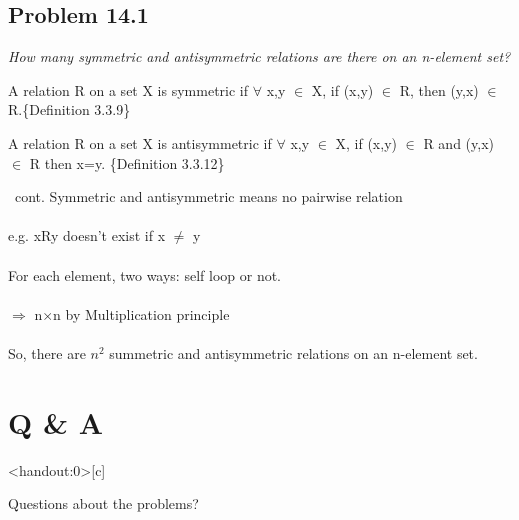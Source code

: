 \documentclass{beamer}
\begin{document}
        
        
    \subsection{Problem 14.1}
    
        \begin{frame}[c,shrink]{\subsecname}
            \textit{How many symmetric and antisymmetric relations are there on an n-element
set?}\\\pause
                \begin{definition}
			    A relation R on a set X is \alert{symmetric} if $\forall$ x,y $\in$ X, if (x,y) $\in$ R, then (y,x) $\in$ R.\{Definition 3.3.9\}
                \end{definition}\pause
                \begin{definition}
			    A relation R on a set X is \alert{antisymmetric} if $\forall$ x,y $\in$ X, if (x,y) $\in$ R and (y,x) $\in$ R then x=y. \{Definition 3.3.12\}
                \end{definition}
        \end{frame}
    
        \begin{frame}[c]{\subsecname\ cont.}
            Symmetric and antisymmetric means \alert{no pairwise relation}\\$\;$\\\pause
            e.g. xRy doesn't exist if x $\neq$ y\\$\;$\\\pause
            For each element, two ways: self loop or not.\\$\;$\\\pause
            $\Rightarrow$ n$\times$n by Multiplication principle\\$\;$\\\pause
            So, there are $n^2$ summetric and antisymmetric relations on an n-element set. 
        \end{frame}
        
        
        
\section*{Q \& A}

    \begin{frame}<handout:0>[c]{\secname}
        \centerline{\Huge{Questions about the problems?}}
    \end{frame}
    
    
    
\end{document}
